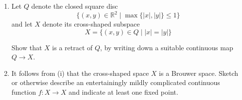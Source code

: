\documentclass[12 pt, letterpaper]{hmcpset}
\begin{document}
\pagebreak

\begin{problem}[18.]
	\begin{enumerate}
		\item Let $Q$ denote the closed square disc
			\[
				\{ (x, y) \in \mathbb{R}^{2} \mid \max \{ \lvert x \rvert, \lvert y \rvert \} \le 1 \}
			\]
			and let $X$ denote its cross-shaped subspace
			\[
				X = \{ (x, y) \in Q \mid \lvert x \rvert = \lvert y \rvert \}
			\]

			Show that $X$ is a retract of $Q$, by writing down a suitable continuous map $Q \to X$.

		\item It follows from (i) that the cross-shaped space $X$ is a Brouwer space. Sketch or otherwise describe an entertainingly mildly complicated continuous function $f : X \to X$ and indicate at least one fixed point.
	\end{enumerate}
\end{problem}
\end{document}
